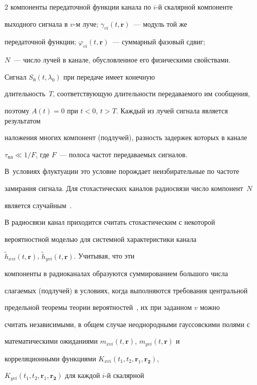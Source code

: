 \begin{multicols}{2}
компоненты передаточной функции канала по $i$-й скалярной компоненте 


выходного сигнала в $v$-м луче; $\gamma_{vi}(t,\mathbf{r})$~--- модуль той же 


передаточной функции; $\varphi_{vi}(t,\mathbf{r})$~--- суммарный фазовый сдвиг; 


$N$~--- число лучей в канале, обусловленное его физическими свойствами.





Сигнал $S_{\mathrm{п}}(t,\lambda_0)$ при передаче имеет конечную 


длительность~$T$, соответствующую длительности передаваемого им сообщения, 


поэтому $A(t)=0$ при $t<0$, $t>T$. Каждый из лучей сигнала является результатом 


наложения многих компонент (подлучей), разность задержек которых в канале 


$\tau_{\mathrm{пл}}\ll 1/F$, где $F$~--- полоса частот передаваемых сигналов. 


В~условиях флуктуации это условие порождает неизбирательные по частоте 


замирания сигнала. Для стохастических каналов радиосвязи число компонент~$N$ 


является случайным~\cite{6-pr}. 


     


     В радиосвязи канал приходится считать стохастическим с некоторой 


вероятностной моделью для системной характеристики канала 


$\tilde{h}_{xvi}(t,\mathbf{r})$, $\tilde{h}_{yvi}(t,\mathbf{r})$. Учитывая, что эти 


компоненты в радиоканалах образуются суммированием большого числа 


слагаемых (подлучей) в условиях, когда выполняются требования центральной 


предельной теоремы теории вероятностей~\cite{7-pr}, их при заданном $v$ можно 


считать независимыми, в общем случае неоднородными гауссовскими полями с 


математическими ожиданиями $m_{xvi}(t,\mathbf{r})$, $m_{yvi}(t,\mathbf{r})$ и 


корреляционными функциями $K_{xvi}(t_1, t_2, \mathbf{r}_1, \mathbf{r_2})$, 


$K_{yvi}(t_1, t_2, \mathbf{r}_1, \mathbf{r_2})$ для каждой $i$-й скалярной 



\end{multicols}
